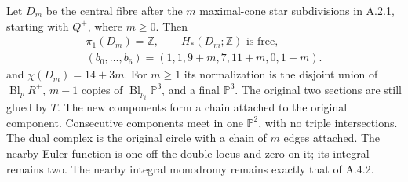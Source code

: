 \begin{proposition}\label{push:src:A.4.6}\label{push:A46}
Let $D_m$ be the central fibre after the $m$ maximal-cone
star subdivisions in A.2.1, starting with $Q^+$, where
$m\geq0$. Then
\[
 \begin{gathered}
 \pi_1(D_m)=\mathbb Z,\qquad
 H_*(D_m;\mathbb Z)\text{ is free},\\
 (b_0,\ldots,b_6)=(1,1,9+m,7,11+m,0,1+m).
 \end{gathered}
\]
and $\chi(D_m)=14+3m$. For $m\geq1$ its normalization is
the disjoint union of $\operatorname{Bl}_pR^+$, $m-1$
copies of $\operatorname{Bl}_{p_i}\mathbb P^3$, and a final
$\mathbb P^3$. The original two sections are still glued
by $T$. The new components form a chain attached to the
original component. Consecutive components meet in one
$\mathbb P^2$, with no triple intersections. The dual
complex is the original circle with a chain of $m$ edges
attached. The nearby Euler function is one off the double
locus and zero on it; its integral remains two. The nearby
integral monodromy remains exactly that of A.4.2.
\end{proposition}

